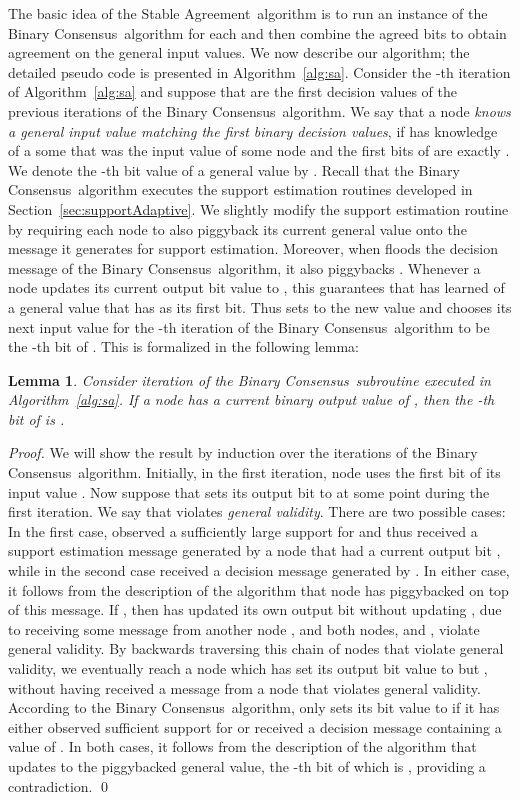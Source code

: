 \documentclass[leqno,11pt]{article}
\newtheorem{lemma}[theorem]{Lemma}
\newcommand{\sa}{{\sc Stable Agreement}}
\newcommand{\bc}{{\sc Binary Consensus}}
\begin{document}
The basic idea of the \sa\ algorithm is to run an instance of the \bc\ algorithm
for each  and then combine the agreed bits  to obtain agreement on the
general input values. We now describe our algorithm; the detailed pseudo code is
presented in Algorithm~\ref{alg:sa}.
Consider the -th iteration of Algorithm~\ref{alg:sa} and suppose that  are the first  decision values of the previous  iterations of the \bc\ algorithm.
We say that a node  \emph{knows a general input value matching the first  binary decision values}, if  has knowledge of a some  that was the input value of some node  and the first  bits of  are exactly .
We denote the -th bit value of a general value  by .
Recall that the \bc\ algorithm executes the support estimation routines developed in Section~\ref{sec:supportAdaptive}.
We slightly modify the support estimation routine by requiring each node  to also piggyback its current general value  onto the message it generates for support estimation.
Moreover, when  floods the decision message of the \bc\ algorithm, it also piggybacks .
Whenever a node  updates its current output bit value to , this guarantees that  has learned of a general value  that has  as its first bit.
Thus  sets  to the new value  and chooses its next input value for the -th iteration of the \bc\ algorithm to be the -th bit of .
This is formalized in the following lemma:
\begin{lemma} \label{lem:validity}
  Consider iteration  of the \bc\ subroutine executed in Algorithm~\ref{alg:sa}.
  If a node  has a current binary output value of , then the -th bit of  is .
\end{lemma}
\begin{proof}
  We will show the result by induction over the iterations of the \bc\ algorithm. 
  Initially, in the first iteration, node  uses the first bit of its input value .
  Now suppose that  sets its output bit to  at some point during the first iteration.
  We say that  violates \emph{general validity}.
  There are two possible cases: In the first case,  observed a sufficiently large support for  and thus received a support estimation message generated by a node  that had a current output bit , while in the second case  received a decision message generated by .
  In either case, it follows from the description of the algorithm that node  has piggybacked  on top of this message.
  If , then  has updated its own output bit without updating , due to receiving some message from another node , and both nodes,  and , violate general validity.
 By backwards traversing this chain of nodes that violate general validity, we eventually reach a node  which has set its output bit value to  but , without having received a message from a node that violates general validity.
  According to the \bc\ algorithm,  only sets its bit value to  if it has either observed sufficient support for  or received a decision message containing a value of .
  In both cases, it follows from the description of the algorithm that  updates  to the piggybacked general value, the -th bit of which is , providing a contradiction.
  \qed
\end{proof}
\end{document}
